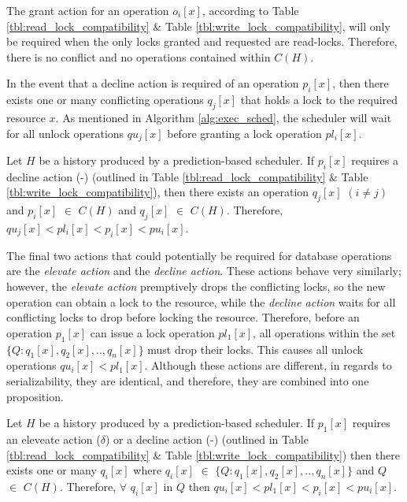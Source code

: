 The grant action for an operation $o_{i}[x]$, according to Table \ref{tbl:read_lock_compatibility} \& Table \ref{tbl:write_lock_compatibility}, will only be required when the only locks granted and requested are read-locks. Therefore, there is no conflict and no operations contained within $C(H)$.

In the event that a decline action is required of an operation $p_{i}[x]$, then there exists one or many conflicting operations $q_{j}[x]$ that holds a lock to the required resource $x$. As mentioned in Algorithm \ref{alg:exec_sched}, the scheduler will wait for all unlock operations $qu_{j}[x]$ before granting a lock operation $pl_{i}[x]$.

\begin{proposition}
\label{prop:decline}
Let $H$ be a history produced by a prediction-based scheduler. If $p_{i}[x]$ requires a decline action (-) (outlined in Table \ref{tbl:read_lock_compatibility} \& Table \ref{tbl:write_lock_compatibility}), then there exists an operation $q_{j}[x]$ $(i \neq j)$ and $p_{i}[x]$ $\in$ $C(H)$ and $q_{j}[x]$ $\in$ $C(H)$. Therefore, $qu_{j}[x] < pl_{i}[x] < p_{i}[x] < pu_{i}[x]$.
\end{proposition}

The final two actions that could potentially be required for database operations are the \textit{elevate action} and the \textit{decline action}. These actions behave very similarly; however, the \textit{elevate action} premptively drops the conflicting locks, so the new operation can obtain a lock to the resource, while the \textit{decline action} waits for all conflicting locks to drop before locking the resource. Therefore, before an operation $p_{1}[x]$ can issue a lock operation $pl_{1}[x]$, all operations within the set $\{Q:q_{1}[x],q_{2}[x],..,q_{n}[x]\}$ must drop their locks. This causes all unlock operations $qu_{i}[x] < pl_{1}[x]$. Although these actions are different, in regards to serializability, they are identical, and therefore, they are combined into one proposition. 

\begin{proposition}
\label{prop:elevate_decline}
Let $H$ be a history produced by a prediction-based scheduler. If $p_{1}[x]$ requires an eleveate action ($\delta$) or a decline action (-) (outlined in Table \ref{tbl:read_lock_compatibility} \& Table \ref{tbl:write_lock_compatibility}) then there exists one or many $q_{i}[x]$ where $q_{i}[x]$ $\in$ $\{Q:q_{1}[x],q_{2}[x],..,q_{n}[x]\}$ and $Q$ $\in$ $C(H)$. Therefore, $\forall$ $q_{i}[x]$ in $Q$ then $qu_{i}[x] < pl_{1}[x] < p_{i}[x] < pu_{i}[x]$.
\end{proposition}

